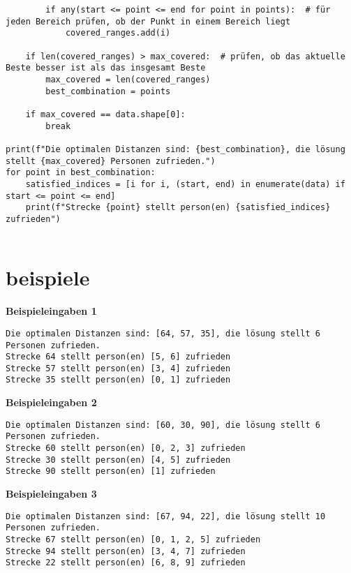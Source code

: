 \begin{lstlisting}
        if any(start <= point <= end for point in points):  # für jeden Bereich prüfen, ob der Punkt in einem Bereich liegt
            covered_ranges.add(i)

    if len(covered_ranges) > max_covered:  # prüfen, ob das aktuelle Beste besser ist als das insgesamt Beste
        max_covered = len(covered_ranges)
        best_combination = points

    if max_covered == data.shape[0]:
        break

print(f"Die optimalen Distanzen sind: {best_combination}, die lösung stellt {max_covered} Personen zufrieden.")
for point in best_combination:
    satisfied_indices = [i for i, (start, end) in enumerate(data) if start <= point <= end]
    print(f"Strecke {point} stellt person(en) {satisfied_indices} zufrieden")


\end{lstlisting}

\section{beispiele}





\newcommand{\outputheading}[1]{\textbf{\large Beispieleingaben #1}}


\outputheading{1}

\begin{lstlisting}
Die optimalen Distanzen sind: [64, 57, 35], die lösung stellt 6 Personen zufrieden.
Strecke 64 stellt person(en) [5, 6] zufrieden
Strecke 57 stellt person(en) [3, 4] zufrieden
Strecke 35 stellt person(en) [0, 1] zufrieden
\end{lstlisting}

\outputheading{2}

\begin{lstlisting}
Die optimalen Distanzen sind: [60, 30, 90], die lösung stellt 6 Personen zufrieden.
Strecke 60 stellt person(en) [0, 2, 3] zufrieden
Strecke 30 stellt person(en) [4, 5] zufrieden
Strecke 90 stellt person(en) [1] zufrieden
\end{lstlisting}

\outputheading{3}

\begin{lstlisting}
Die optimalen Distanzen sind: [67, 94, 22], die lösung stellt 10 Personen zufrieden.
Strecke 67 stellt person(en) [0, 1, 2, 5] zufrieden
Strecke 94 stellt person(en) [3, 4, 7] zufrieden
Strecke 22 stellt person(en) [6, 8, 9] zufrieden
\end{lstlisting}

